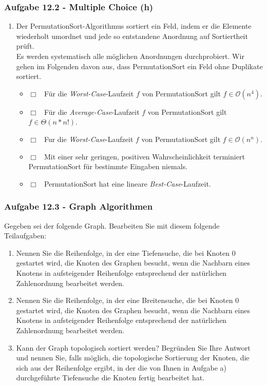 \documentclass{beamer}
\begin{document}
\begin{frame}[t]
	\frametitle{Aufgabe 12.2 - Multiple Choice (h)}
	\small
	\begin{enumerate}[label=\textcolor{black}{\alph*)},align=left,leftmargin=*,itemsep=1em,start=8]
		\item Der PermutationSort-Algorithmus sortiert ein Feld, indem er die Elemente wiederholt
		      umordnet und jede so entstandene Anordnung auf Sortiertheit prüft. \\
		      Es werden systematisch alle möglichen Anordnungen durchprobiert. Wir gehen im Folgenden davon
		      aus, dass PermutationSort ein Feld ohne Duplikate sortiert.
		      \begin{itemize}[label={},itemsep=3pt,align=left,leftmargin=*]
			      \item $\Box$ \, Für die \textit{Worst-Case}-Laufzeit $f$ von PermutationSort gilt $f \in \mathcal{O}(n^4)$.
			      \item $\Box$ \, Für die \textit{Average-Case}-Laufzeit $f$ von PermutationSort gilt $f \in \Theta(n \ast n!)$.
			      \item $\Box$ \, Fur die \textit{Worst-Case}-Laufzeit $f$ von PermutationSort gilt $f \in \mathcal{O}(n^n)$.
			      \item $\Box$ \, Mit einer sehr geringen, positiven Wahrscheinlichkeit terminiert PermutationSort
			            für bestimmte Eingaben niemals.
			      \item $\Box$ \, PermutationSort hat eine lineare \textit{Best-Case}-Laufzeit.
		      \end{itemize}
	\end{enumerate}
\end{frame}

\begin{frame}
	\frametitle{Aufgabe 12.3 - Graph Algorithmen}
	\small
	Gegeben sei der folgende Graph. Bearbeiten Sie mit diesem folgende Teilaufgaben:
	\begin{enumerate}[label=\textcolor{black}{\alph*)},align=left,leftmargin=*,itemsep=1em,start=8]
		\item Nennen Sie die Reihenfolge, in der eine Tiefensuche, die bei Knoten $0$ gestartet wird,
		      die Knoten des Graphen besucht, wenn die Nachbarn eines Knotens in aufsteigender
		      Reihenfolge entsprechend der natürlichen Zahlenordnung bearbeitet werden.
		\item Nennen Sie die Reihenfolge, in der eine Breitensuche, die bei Knoten $0$ gestartet wird,
		      die Knoten des Graphen besucht, wenn die Nachbarn eines Knotens in aufsteigender
		      Reihenfolge entsprechend der natürlichen Zahlenordnung bearbeitet werden.
		\item Kann der Graph topologisch sortiert werden? Begründen Sie Ihre Antwort und nennen
		      Sie, falls möglich, die topologische Sortierung der Knoten, die sich aus der Reihenfolge
		      ergibt, in der die von Ihnen in Aufgabe a) durchgeführte Tiefensuche die Knoten fertig
		      bearbeitet hat.
	\end{enumerate}
\end{frame}
\end{document}

